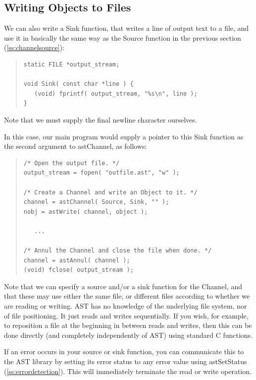\documentclass[twoside,11pt]{article}
\newcommand{\htmlref}[2]{#1}
\newcommand{\secref}[1]{\S\ref{#1}}
\renewcommand{\secref}[1]{\ref{#1}}
\begin{document}
\subsection{\label{ss:channelsink}Writing Objects to Files}

We can also write a Sink function, that writes a line of output text
to a file, and use it in basically the same way as the Source function
in the previous section (\secref{ss:channelsource}):

\begin{quote}
\small
\begin{verbatim}
static FILE *output_stream;

void Sink( const char *line ) {
   (void) fprintf( output_stream, "%s\n", line );
}
\end{verbatim}
\normalsize
\end{quote}

Note that we must supply the final newline character ourselves.

In this case, our main program would supply a pointer to this Sink
function as the second argument to \htmlref{astChannel}{astChannel}, as follows:

\begin{quote}
\small
\begin{verbatim}
/* Open the output file. */
output_stream = fopen( "outfile.ast", "w" );

/* Create a Channel and write an Object to it. */
channel = astChannel( Source, Sink, "" );
nobj = astWrite( channel, object );

   ...

/* Annul the Channel and close the file when done. */
channel = astAnnul( channel );
(void) fclose( output_stream );
\end{verbatim}
\normalsize
\end{quote}

Note that we can specify a source and/or a sink function for the
\htmlref{Channel}{Channel}, and that these may use either the same file, or different
files according to whether we are reading or writing. AST has no
knowledge of the underlying file system, nor of file positioning. It
just reads and writes sequentially. If you wish, for example, to
reposition a file at the beginning in between reads and writes, then
this can be done directly (and completely independently of AST) using
standard C functions.

If an error occurs in your source or sink function, you can
communicate this to the AST library by setting its error status to any
error value using \htmlref{astSetStatus}{astSetStatus} (\secref{ss:errordetection}). This will
immediately terminate the read or write operation.
\end{document}
